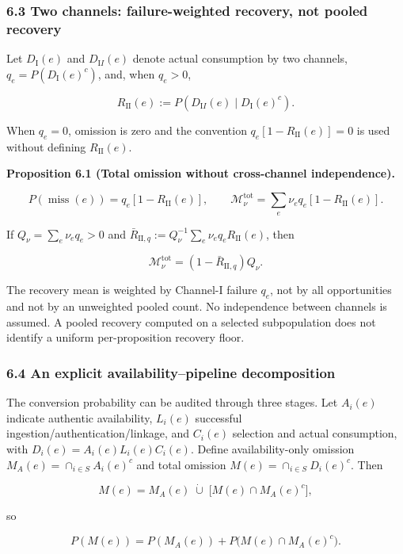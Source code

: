 \documentclass[
  11pt]{article}
\begin{document}
\subsubsection{6.3 Two channels: failure-weighted recovery, not pooled
recovery}\label{two-channels-failure-weighted-recovery-not-pooled-recovery}

Let \(D_{\mathrm I}(e)\) and \(D_{\mathrm II}(e)\) denote actual
consumption by two channels, \(q_e=P(D_{\mathrm I}(e)^c)\), and, when
\(q_e>0\),

\[R_{\mathrm{II}}(e):=P(D_{\mathrm II}(e)\mid D_{\mathrm I}(e)^c).\]

When \(q_e=0\), omission is zero and the convention
\(q_e[1-R_{\mathrm{II}}(e)]=0\) is used without defining
\(R_{\mathrm{II}}(e)\).

\textbf{Proposition 6.1 (Total omission without cross-channel
independence).}

\[P(\operatorname{miss}(e))=q_e[1-R_{\mathrm{II}}(e)],\qquad
\mathcal M_\nu^{\mathrm{tot}}=\sum_e\nu_eq_e[1-R_{\mathrm{II}}(e)].\]

If \(Q_\nu=\sum_e\nu_eq_e>0\) and
\(\bar R_{\mathrm{II},q}:=Q_\nu^{-1}\sum_e\nu_eq_eR_{\mathrm{II}}(e)\),
then

\[\mathcal M_\nu^{\mathrm{tot}}=(1-\bar R_{\mathrm{II},q})Q_\nu.\]

The recovery mean is weighted by Channel-I failure \(q_e\), not by all
opportunities and not by an unweighted pooled count. No independence
between channels is assumed. A pooled recovery computed on a selected
subpopulation does not identify a uniform per-proposition recovery
floor.

\subsubsection{6.4 An explicit availability--pipeline
decomposition}\label{an-explicit-availabilitypipeline-decomposition}

The conversion probability can be audited through three stages. Let
\(A_i(e)\) indicate authentic availability, \(L_i(e)\) successful
ingestion/authentication/linkage, and \(C_i(e)\) selection and actual
consumption, with \(D_i(e)=A_i(e)L_i(e)C_i(e)\). Define
availability-only omission \(M_A(e)=\cap_{i\in S}A_i(e)^c\) and total
omission \(M(e)=\cap_{i\in S}D_i(e)^c\). Then

\[M(e)=M_A(e)\;\dot\cup\;\big[M(e)\cap M_A(e)^c\big],\]

so

\[P(M(e))=P(M_A(e))+P\big(M(e)\cap M_A(e)^c\big).\]
\end{document}
